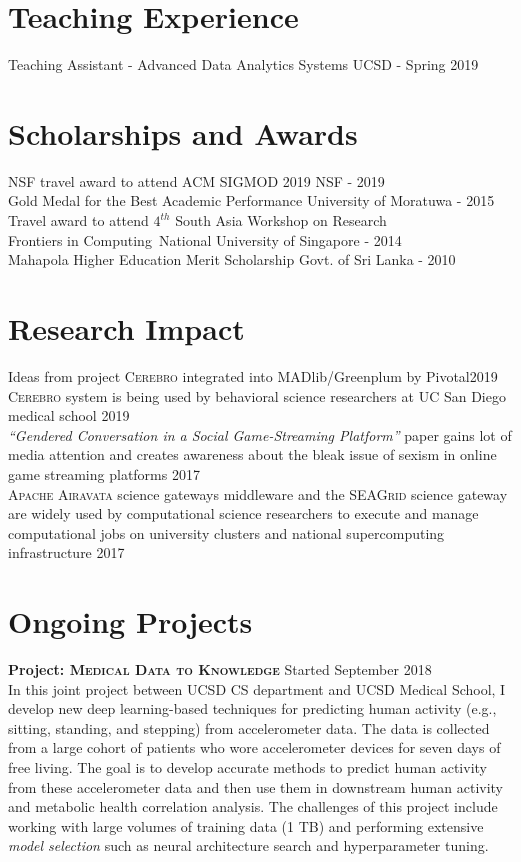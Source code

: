 \documentclass[margin]{res}
\begin{document}
\begin{resume}
\section{Teaching Experience}
Teaching Assistant - Advanced Data Analytics Systems \hfill UCSD - Spring 2019


\section{Scholarships and Awards}
NSF travel award to attend ACM SIGMOD 2019 \hfill NSF - 2019
\\
Gold Medal for the Best Academic Performance \hfill University of Moratuwa - 2015
\\
Travel award to attend $4^{th}$ South Asia Workshop on Research\\ Frontiers in Computing~\hfill National University of Singapore - 2014
\\
Mahapola Higher Education Merit Scholarship \hfill Govt. of Sri Lanka - 2010


\section{Research Impact}
Ideas from project \textsc{Cerebro} integrated into MADlib/Greenplum by Pivotal\hfill 2019\\
\textsc{Cerebro} system is being used by behavioral science researchers at UC San Diego medical school \hfill 2019\\
\textit{``Gendered Conversation in a Social Game-Streaming Platform''} paper gains lot of media attention and creates awareness about the bleak issue of sexism in online game streaming platforms \hfill 2017\\
\textsc{Apache Airavata} science gateways middleware and the \textsc{SEAGrid} science gateway are widely used by computational science researchers to execute and manage computational jobs on university clusters and national supercomputing infrastructure \hfill 2017


\vspace{2mm}
\section{Ongoing Projects}
\par

\textbf{Project: \textsc{Medical Data to Knowledge}} \hfill Started September 2018\\
In this joint project between UCSD CS department and UCSD Medical School, I develop new deep learning-based techniques for predicting human activity (e.g., sitting, standing, and stepping) from accelerometer data. The data is collected from a large cohort of patients who wore accelerometer devices for seven days of free living. The goal is to develop accurate methods to predict human activity from these accelerometer data and then use them in downstream human activity and metabolic health correlation analysis. The challenges of this project include working with large volumes of training data (1 TB) and performing extensive \textit{model selection} such as neural architecture search and hyperparameter tuning.



\end{resume}
\end{document}
